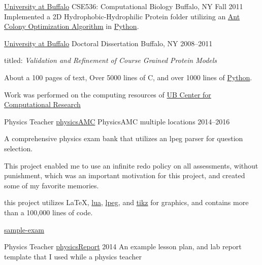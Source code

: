 \begin{cventries}
  \cventry
    {\href{www.buffalo.edu}{University at Buffalo}}
    {CSE536: Computational Biology}
    {Buffalo, NY} {Fall 2011}
	{Implemented a 2D Hydrophobic-Hydrophilic Protein folder utilizing an \href{https://en.wikipedia.org/wiki/Ant_colony_optimization_algorithms}{Ant Colony Optimization Algorithm} in \href{www.python.org}{Python}.}

  \cventry
    {\href{www.buffalo.edu}{University at Buffalo}}
    {Doctoral Dissertation}
    {Buffalo, NY} {2008--2011}
{
\begin{cvitems}
    \item {titled: \emph{Validation and Refinement of Course Grained Protein Models}}
    \item {About a 100 pages of text, Over 5000 lines of C, and over 1000 lines of \href{www.python.org}{Python}.}
    \item {Work was performed on the computing resources of \href{ccr.buffalo.edu}{UB Center for Computational Research}}
\end{cvitems}
}


  \cventry
    {Physics Teacher} %
    {\href{https://github.com/jphafner/physicsAMC}{physicsAMC}} %
    {PhysicsAMC}
    {multiple locations}
    {2014--2016} %
{
\begin{cvitems}
    \item {A comprehensive physics exam bank that utilizes an lpeg parser for question selection.}
    \item {This project enabled me to use an infinite redo policy on all assessments, without punishment, which was an important motivation for this project, and created some of my favorite memories.}
    \item {this project utilizes \LaTeX, \href{lua.org}{lua}, \href{http://www.inf.puc-rio.br/~roberto/lpeg/}{lpeg}, and \href{http://www.texample.net/tikz/}{tikz} for graphics, and contains more than a 100,000 lines of code.}
    \item { \href{https://github.com/jphafner/physicsAMC/blob/mc-project/kinematics-exam/sample-exam.pdf}{sample-exam}}
\end{cvitems}
}

  \cventry
    {Physics Teacher} %
    {\href{https://github.com/jphafner/physicsReport}{physicsReport}}
    {2014}
    {An example lesson plan, and lab report template that I used while a physics teacher}

\end{cventries}

